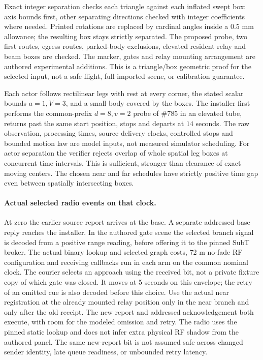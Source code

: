 \documentclass{article}
\begin{document}
Exact integer separation checks each triangle against each
inflated swept box: axis bounds first, other separating
directions checked with integer coefficients where needed.
Printed rotations are replaced by cardinal angles inside a
0.5 mm allowance; the resulting box stays strictly separated.
The proposed probe, two first routes, egress routes,
parked-body exclusions, elevated resident relay and beam
boxes are checked. The marker, gates and relay mounting
arrangement are authored experimental additions. This is a
triangle/box geometric proof for the selected input,
not a safe flight, full imported scene, or calibration guarantee.

Each actor follows rectilinear legs with rest at every
corner, the stated scalar bounds \(a=1,V=3\), and a small
body covered by the boxes. The installer first performs the
common-prefix \(d=8,v=2\) probe of \#785 in an elevated
tube, returns past the same start position, stops and departs
at \(14\) seconds. The raw observation, processing times,
source delivery clocks, controlled stops and bounded motion
law are model inputs, not measured simulator scheduling.
For actor separation the verifier rejects overlap of whole
spatial leg boxes at concurrent time intervals. This is
sufficient, stronger than clearance of exact moving centers.
The chosen near and far schedules have strictly positive
time gap even between spatially intersecting boxes.

\paragraph{Actual selected radio events on that clock.}
At zero the earlier source report arrives at the base.
A separate addressed base reply reaches the installer.
In the authored gate scene the selected branch signal is
decoded from a positive range reading, before offering it
to the pinned SubT broker. The actual binary lookup and
selected graph costs, 72 m no-fade RF configuration and
receiving callbacks run in each arm on the common nominal
clock. The courier selects an approach using the received
bit, not a private fixture copy of which gate was closed.
It moves at 5 seconds on this envelope; the retry of an
omitted cue is also decoded before this choice.
Use the actual near registration at the already mounted
relay position only in the near branch and only after the old
receipt. The new report and addressed acknowledgement both
execute, with room for the modeled omission and retry.
The radio uses the pinned static lookup and does not infer
extra physical RF shadow from the authored panel. The same
new-report bit is not assumed safe across changed sender
identity, late queue readiness, or unbounded retry latency.
\end{document}
